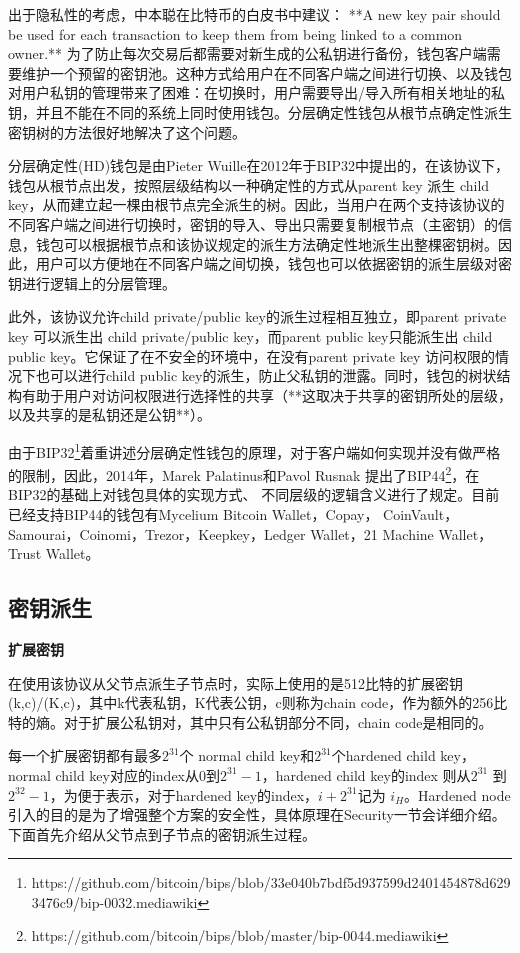 \documentclass{article}
\begin{document}
出于隐私性的考虑，中本聪在比特币的白皮书中建议： **A new key pair should be used for each transaction to keep them
from being linked to a common owner.** 为了防止每次交易后都需要对新生成的公私钥进行备份，钱包客户端需要维护一个预留的密钥池。这种方式给用户在不同客户端之间进行切换、以及钱包对用户私钥的管理带来了困难：在切换时，用户需要导出/导入所有相关地址的私钥，并且不能在不同的系统上同时使用钱包。分层确定性钱包从根节点确定性派生密钥树的方法很好地解决了这个问题。

分层确定性(HD)钱包是由Pieter Wuille在2012年于BIP32中提出的，在该协议下，钱包从根节点出发，按照层级结构以一种确定性的方式从parent key 派生 child key，从而建立起一棵由根节点完全派生的树。因此，当用户在两个支持该协议的不同客户端之间进行切换时，密钥的导入、导出只需要复制根节点（主密钥）的信息，钱包可以根据根节点和该协议规定的派生方法确定性地派生出整棵密钥树。因此，用户可以方便地在不同客户端之间切换，钱包也可以依据密钥的派生层级对密钥进行逻辑上的分层管理。
  
此外，该协议允许child private/public key的派生过程相互独立，即parent private key 可以派生出 child private/public key，而parent public key只能派生出 child public key。它保证了在不安全的环境中，在没有parent private key 访问权限的情况下也可以进行child public key的派生，防止父私钥的泄露。同时，钱包的树状结构有助于用户对访问权限进行选择性的共享（**这取决于共享的密钥所处的层级，以及共享的是私钥还是公钥**）。  

由于BIP32\footnote{https://github.com/bitcoin/bips/blob/33e040b7bdf5d937599d2401454878d6293476c9/bip-0032.mediawiki}着重讲述分层确定性钱包的原理，对于客户端如何实现并没有做严格的限制，因此，2014年，Marek Palatinus和Pavol Rusnak 提出了BIP44\footnote{https://github.com/bitcoin/bips/blob/master/bip-0044.mediawiki}，在BIP32的基础上对钱包具体的实现方式、 不同层级的逻辑含义进行了规定。目前已经支持BIP44的钱包有Mycelium Bitcoin Wallet，Copay， CoinVault，Samourai，Coinomi，Trezor，Keepkey，Ledger Wallet，21 Machine Wallet， Trust Wallet。  

\subsection{密钥派生}

\textbf{扩展密钥}

 在使用该协议从父节点派生子节点时，实际上使用的是512比特的扩展密钥(k,c)/(K,c)，其中k代表私钥，K代表公钥，c则称为chain code，作为额外的256比特的熵。对于扩展公私钥对，其中只有公私钥部分不同，chain code是相同的。
 
 每一个扩展密钥都有最多$2^{31}$个 normal child key和$2^{31}$个hardened child key， normal child key对应的index从0到$2^{31}-1$，hardened child key的index 则从$2^{31}$ 到$2^{32}-1$，为便于表示，对于hardened key的index，$i+2^{31}$记为 $i_H$。Hardened node引入的目的是为了增强整个方案的安全性，具体原理在Security一节会详细介绍。下面首先介绍从父节点到子节点的密钥派生过程。
\end{document}
